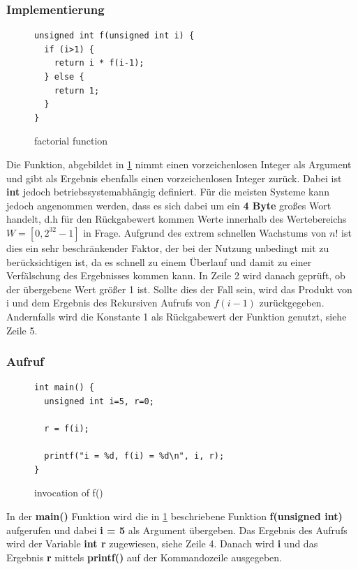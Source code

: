 \documentclass[12pt]{article}
\begin{document}
{\subsubsection{Implementierung}
\begin{figure}[h]
\begin{lstlisting}
unsigned int f(unsigned int i) {
  if (i>1) {
    return i * f(i-1);
  } else {
    return 1;
  }
}
\end{lstlisting}
\label{fig:factorial}
\caption{factorial function}
\end{figure}

Die Funktion, abgebildet in \ref{fig:factorial} nimmt einen vorzeichenlosen Integer als Argument und gibt als Ergebnis ebenfalls einen vorzeichenlosen Integer zurück. Dabei ist \textbf{int} jedoch betriebssystemabhängig definiert. Für die meisten Systeme kann jedoch angenommen werden, dass es sich dabei um ein \textbf{4 Byte} großes Wort handelt, d.h für den Rückgabewert kommen Werte innerhalb des Wertebereichs $  W = [0,2^{32}-1] $ in Frage. Aufgrund des extrem schnellen Wachstums von $ n! $ ist dies ein sehr beschränkender Faktor, der bei der Nutzung unbedingt mit zu berücksichtigen ist, da es schnell zu einem Überlauf und damit zu einer Verfälschung des Ergebnisses kommen kann. In Zeile 2 wird danach geprüft, ob der übergebene Wert größer 1 ist. Sollte dies der Fall sein, wird das  Produkt von i und dem Ergebnis des Rekursiven Aufrufs von $ f(i-1) $ zurückgegeben. Andernfalls wird die Konstante 1 als Rückgabewert der Funktion genutzt, siehe Zeile 5.
\newpage

\subsubsection{Aufruf}
\begin{figure}[h]
\begin{lstlisting}
int main() {
  unsigned int i=5, r=0;

  r = f(i);

  printf("i = %d, f(i) = %d\n", i, r);
}
\end{lstlisting}
\label{fig:factorial-main}
\caption{invocation of f()}
\end{figure}

In der \textbf{main()} Funktion wird die in \ref{fig:factorial} beschriebene Funktion \textbf{f(unsigned int)} aufgerufen und dabei \textbf{i = 5} als Argument übergeben. Das Ergebnis des Aufrufs wird der Variable \textbf{int r} zugewiesen, siehe Zeile 4. Danach wird \textbf{i} und das Ergebnis \textbf{r} mittels \textbf{printf()} auf der Kommandozeile ausgegeben.

}
\end{document}
